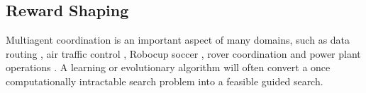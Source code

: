 \documentclass{aamas2014}
\begin{document}





\subsection{Reward Shaping}
Multiagent coordination is an important aspect of many domains, such as data routing \cite{tumer-wolpert_jair02}, air traffic control \cite{tumer-agogino_jaamas12}, Robocup soccer \cite{AAMAS12-agmon}, rover coordination \cite{5509316} and power plant operations \cite{Colby:2012:SFF:2343576.2343637}. A learning or evolutionary algorithm will often convert a once computationally intractable search problem into a feasible guided search. 
\end{document}
